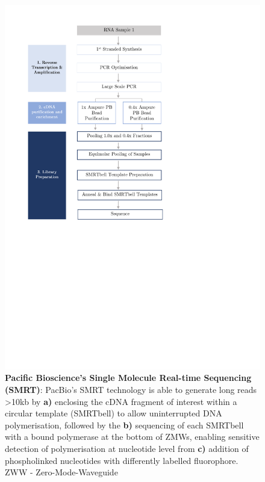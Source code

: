 \begin{figure}[!h]
	\centering
	\includegraphics[page=14,trim={0 5cm 0 0 },clip, scale = 0.7]{Figures/ProjectDevelopment_Figures.pdf}
	\captionsetup{width=0.95\textwidth}
	\caption[Pacific Bioscience's Single Molecule Real-time Sequencing]%
	{\textbf{Pacific Bioscience's Single Molecule Real-time Sequencing (SMRT)}: PacBio's SMRT technology is able to generate long reads >10kb by \textbf{a)} enclosing the cDNA fragment of interest within a circular template (SMRTbell) to allow uninterrupted DNA polymerisation,  followed by the \textbf{b)} sequencing of each SMRTbell with a bound polymerase at the bottom of ZMWs, enabling sensitive detection of polymerisation at nucleotide level from \textbf{c)} addition of phospholinked nucleotides with differently labelled fluorophore. ZWW - Zero-Mode-Waveguide}
	\label{fig:Mechanism}
\end{figure}


